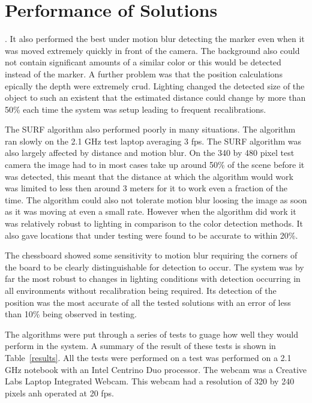 \section{Performance of Solutions}
. It also performed the best under motion blur  detecting the marker even when it was moved extremely quickly in front of the camera. The background also could not contain significant amounts of a similar color or this would be detected instead of the marker. A further problem was that the position calculations epically the depth were extremely crud. Lighting changed the detected size of the object to such an existent that the estimated distance could change by more than 50\% each time the system was setup leading to frequent recalibrations.

The SURF algorithm also performed poorly in many situations. The algorithm ran slowly on the 2.1 GHz test laptop averaging 3 fps. The SURF algorithm was also largely affected by distance and motion blur. On the 340 by 480 pixel test camera the image had to in most cases take up around 50\% of the scene before it was detected, this meant that the distance at which the algorithm would work was limited to less then around 3 meters for it to work even a fraction of the time. The algorithm could also not tolerate motion blur loosing the image as soon as it was moving at even a small rate. However when the algorithm did work it was relatively robust to lighting in comparison to the color detection methods. It also gave locations that under testing were found to be accurate to within 20\%.

The chessboard showed some sensitivity to motion blur requiring the corners of the board to be clearly distinguishable for detection to occur. The system was by far the most robust to changes in lighting conditions with detection occurring in all environments without recalibration being required. Its detection of the position was the most accurate of all the tested solutions with an error of less than 10\% being observed in testing.

The algorithms were put through a series of tests to guage how well they would perform in the system. A summary of the result of these tests is shown in Table~\ref{results}. All the tests were performed on a test was performed on a 2.1 GHz notebook with an Intel Centrino Duo processor. The webcam was a Creative Labs Laptop Integrated Webcam. This webcam had a resolution of 320 by 240 pixels anh operated at 20 fps.

